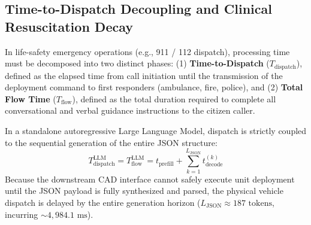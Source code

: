 \documentclass[journal,compsoc]{IEEEtran}
\begin{document}
\subsection{Time-to-Dispatch Decoupling and Clinical Resuscitation Decay}
In life-safety emergency operations (e.g., 911 / 112 dispatch), processing time must be decomposed into two distinct phases: (1) \textbf{Time-to-Dispatch} ($T_{\text{dispatch}}$), defined as the elapsed time from call initiation until the transmission of the deployment command to first responders (ambulance, fire, police), and (2) \textbf{Total Flow Time} ($T_{\text{flow}}$), defined as the total duration required to complete all conversational and verbal guidance instructions to the citizen caller.

In a standalone autoregressive Large Language Model, dispatch is strictly coupled to the sequential generation of the entire JSON structure:
\begin{equation}
T_{\text{dispatch}}^{\text{LLM}} = T_{\text{flow}}^{\text{LLM}} = t_{\text{prefill}} + \sum_{k=1}^{L_{\text{JSON}}} t_{\text{decode}}^{(k)}
\end{equation}
Because the downstream CAD interface cannot safely execute unit deployment until the JSON payload is fully synthesized and parsed, the physical vehicle dispatch is delayed by the entire generation horizon ($L_{\text{JSON}} \approx 187 \text{ tokens}$, incurring $\sim 4,984.1 \text{ ms}$).
\end{document}
